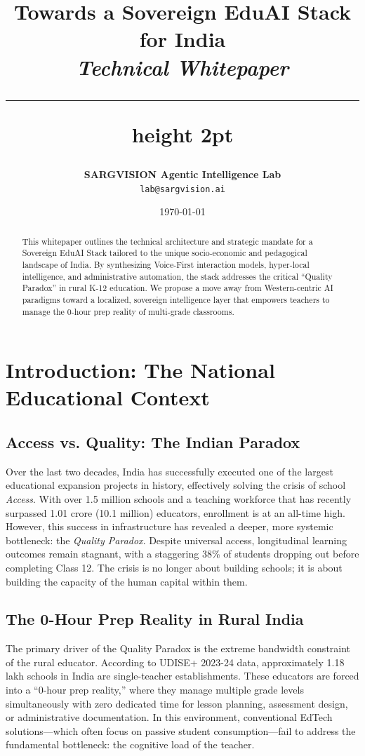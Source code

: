\documentclass[11pt,a4paper]{article}
\title{
    \vspace{-2cm}
    \begin{flushleft}
        \Large\textbf{Towards a Sovereign EduAI Stack for India} \\
        \large\textit{Technical Whitepaper}
    \end{flushleft}
    \vspace{0.5cm}
    \hrule height 2pt
}
\author{
    \textbf{SARGVISION Agentic Intelligence Lab} \\
    \texttt{lab@sargvision.ai}
}
\date{\today}
\begin{document}
\maketitle

\begin{abstract}
\noindent This whitepaper outlines the technical architecture and strategic mandate for a Sovereign EduAI Stack tailored to the unique socio-economic and pedagogical landscape of India. By synthesizing Voice-First interaction models, hyper-local intelligence, and administrative automation, the stack addresses the critical ``Quality Paradox'' in rural K-12 education. We propose a move away from Western-centric AI paradigms toward a localized, sovereign intelligence layer that empowers teachers to manage the 0-hour prep reality of multi-grade classrooms.
\end{abstract}

\section{Introduction: The National Educational Context}
\subsection{Access vs. Quality: The Indian Paradox}
Over the last two decades, India has successfully executed one of the largest educational expansion projects in history, effectively solving the crisis of school \textit{Access}. With over 1.5 million schools and a teaching workforce that has recently surpassed 1.01 crore (10.1 million) educators, enrollment is at an all-time high. However, this success in infrastructure has revealed a deeper, more systemic bottleneck: the \textit{Quality Paradox}. Despite universal access, longitudinal learning outcomes remain stagnant, with a staggering 38\% of students dropping out before completing Class 12. The crisis is no longer about building schools; it is about building the capacity of the human capital within them.

\subsection{The 0-Hour Prep Reality in Rural India}
The primary driver of the Quality Paradox is the extreme bandwidth constraint of the rural educator. According to UDISE+ 2023-24 data, approximately 1.18 lakh schools in India are single-teacher establishments. These educators are forced into a ``0-hour prep reality,'' where they manage multiple grade levels simultaneously with zero dedicated time for lesson planning, assessment design, or administrative documentation. In this environment, conventional EdTech solutions---which often focus on passive student consumption---fail to address the fundamental bottleneck: the cognitive load of the teacher.
\end{document}
